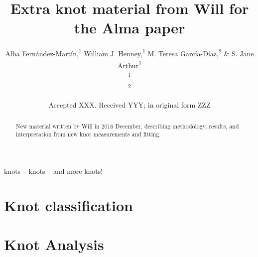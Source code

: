\documentclass[usenatbib]{mnras}
\title[Will's extra material]{Extra knot material from Will for the
  Alma paper}
\author[Fernández-Martín et al.]{
  Alba Fernández-Martín,\textsuperscript{1}
  William J. Henney,\textsuperscript{1}
  M. Teresa García-Díaz,\textsuperscript{2}
  \& S. Jane Arthur\textsuperscript{1}\\
  \textsuperscript{1}\AddressIRyA\\
  \textsuperscript{2}\AddressEnsenada\\
}
\date{Accepted XXX. Received YYY; in original form ZZZ}
\begin{document}
\label{firstpage}
\pagerange{\pageref{firstpage}--\pageref{lastpage}}
\maketitle

\begin{abstract}
New material written by Will in 2016 December, describing methodology,
results, and interpretation from new knot measurements and fitting.
\end{abstract}

\begin{keywords}
knots -- knots -- and more knots!
\end{keywords}

\newcommand\nii{\ensuremath{\ion{N}{ii}}}
\newcommand\ha{\ensuremath{\mathrm{H\alpha}}}

\section{Knot classification}
\label{sec:knot-classification}

\section{Knot Analysis}
\label{sec:knot-analysis}
\end{document}
